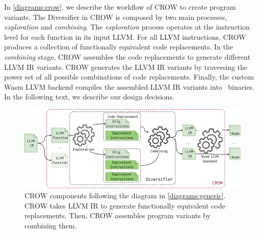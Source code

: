 In \autoref{diagrams:crow}, we describe the workflow of CROW to create program variants.
The Diversifier in CROW is composed by two main processes, \textit{exploration} and \textit{combining}. 
The \emph{exploration} process operates at the instruction level for each function in its input LLVM.
For all LLVM instructions, CROW produces a collection of functionally equivalent code replacements.   
In the \emph{combining} stage, CROW assembles the code replacements to generate different LLVM IR variants.
CROW generates the LLVM IR variants by traversing the power set of all possible combinations of code replacements.
Finally, the custom Wasm LLVM backend compiles the assembled LLVM IR variants into \wasm\ binaries.
In the following text, we describe our design decisions. 

\begin{figure}[h]
    \includegraphics[width=\linewidth]{diagrams/generation/crow.drawio.pdf}
    \caption{CROW components following the diagram in \autoref{diagrams:generic}. CROW takes LLVM IR to generate functionally equivalent code replacements. Then, CROW assembles program variants by combining them.}
    \label{diagrams:crow}
\end{figure}



